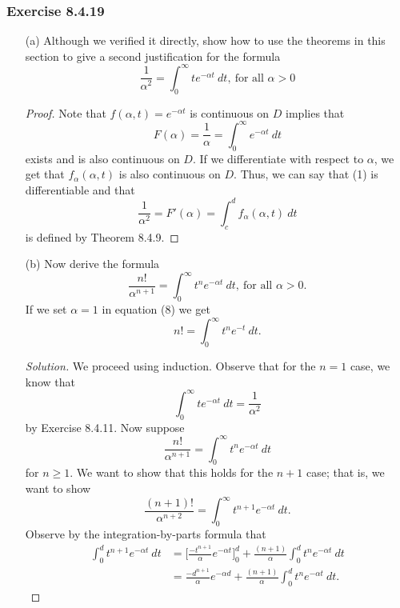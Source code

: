 \subsubsection{Exercise 8.4.19} 
\begin{enumerate}
    \item[(a)] Although we verified it directly, show how to use the theorems in this section to give a second justification for the formula
        \[ \frac{ 1 }{ \alpha^{2}  } = \int_{ 0 }^{ \infty  }  t e^{- \alpha t } \  dt, \ \text{for all } \alpha > 0   \]
        \begin{proof}
        Note that \( f(\alpha, t ) =  e^{- \alpha t } \) is continuous on \( D  \) implies that 
        \[  F( \alpha ) =  \frac{ 1 }{  \alpha  }  =  \int_{ 0 }^{ \infty  }  e^{- \alpha t } \ dt \tag{1} \] exists and is also continuous on \( D  \). If we differentiate with respect to \( \alpha \), we get that \( f_{\alpha}(\alpha,t) \) is also continuous on \( D  \). Thus, we can say that (1) is differentiable and that 
        \[  \frac{ 1 }{ \alpha^{2} } = F'(\alpha) = \int_{ c }^{ d }  f_{\alpha}(\alpha,t) \ dt  \] is defined by Theorem 8.4.9.
        \end{proof}
    \item[(b)] Now derive the formula 
        \[  \frac{ n!  }{ \alpha^{n+1} } = \int_{ 0 }^{ \infty  }  t^{n} e^{- \alpha t } \ dt, \ \text{for all } \alpha > 0.\]
        If we set \( \alpha = 1  \) in equation (8) we get 
        \[  n! = \int_{ 0 }^{ \infty  }  t^{n} e^{-t} \ dt. \]
        \begin{proof}[Solution]
        We proceed using induction. Observe that for the \( n = 1  \) case, we know that 
        \[  \int_{ 0 }^{ \infty  } t e^{-\alpha t } \ dt = \frac{ 1 }{ \alpha^{2} } \]
        by Exercise 8.4.11. Now suppose 
        \[  \frac{ n! }{ \alpha^{n+1} } = \int_{ 0 }^{ \infty  } t^{n} e^{- \alpha t} \ dt  \] for \( n \geq 1  \). We want to show that this holds for the \( n  + 1  \) case; that is, we want to show 
        \[  \frac{ (n+1)! }{ \alpha^{n+2} } = \int_{ 0 }^{ \infty  } t^{n+1} e^{- \alpha t } \ dt. \]
        Observe by the integration-by-parts formula that 
        \begin{align*}
            \int_{ 0 }^{ d } t^{n+1} e^{- \alpha t } \ dt &=  \Big[ \frac{ - t^{n+1} }{ \alpha } e^{- \alpha t  } \Big]_{0}^{d} + \frac{ (n+1) }{ \alpha } \int_{ 0 }^{ d } t^{n} e^{ - \alpha t } \    dt  \\
                                                          &= \frac{ - d^{n+1}  }{ \alpha }  e^{- \alpha d } + \frac{ (n+1)  }{ \alpha } \int_{ 0 }^{ d }  t^{n} e^{- \alpha t } \ dt.

\end{align*}
\end{proof}
\end{enumerate}
